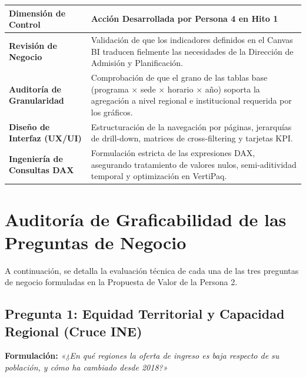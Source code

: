 \documentclass[11pt,a4paper]{article}
\begin{document}
\begin{center}
\small
\begin{tabularx}{\textwidth}{@{}>{\bfseries}p{3.5cm}Y@{}}
\toprule
\textbf{Dimensión de Control} & \textbf{Acción Desarrollada por Persona 4 en Hito 1} \\
\midrule
Revisión de Negocio & Validación de que los indicadores definidos en el Canvas BI traducen fielmente las necesidades de la Dirección de Admisión y Planificación. \\
Auditoría de Granularidad & Comprobación de que el grano de las tablas base (programa $\times$ sede $\times$ horario $\times$ año) soporta la agregación a nivel regional e institucional requerida por los gráficos. \\
Diseño de Interfaz (UX/UI) & Estructuración de la navegación por páginas, jerarquías de drill-down, matrices de cross-filtering y tarjetas KPI. \\
Ingeniería de Consultas DAX & Formulación estricta de las expresiones DAX, asegurando tratamiento de valores nulos, semi-aditividad temporal y optimización en VertiPaq. \\
\bottomrule
\end{tabularx}
\end{center}

\section{Auditoría de Graficabilidad de las Preguntas de Negocio}

A continuación, se detalla la evaluación técnica de cada una de las tres preguntas de negocio formuladas en la Propuesta de Valor de la Persona 2.

\subsection{Pregunta 1: Equidad Territorial y Capacidad Regional (Cruce INE)}
\textbf{Formulación:} \textit{«¿En qué regiones la oferta de ingreso es baja respecto de su población, y cómo ha cambiado desde 2018?»}
\end{document}
